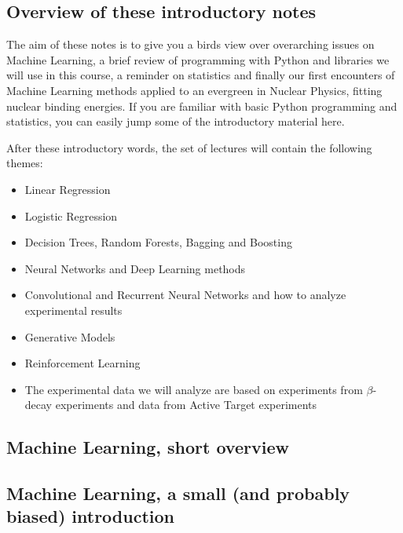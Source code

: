 \documentclass[%
oneside,                 %
final,                   %
10pt]{article}
\begin{document}
\subsection{Overview of these introductory notes}

The aim of these notes is to give you a birds view over overarching issues on  Machine Learning, a brief review of programming with Python and libraries we will use in this course, a reminder on statistics and finally our first encounters of Machine Learning methods applied to an evergreen in Nuclear Physics, fitting nuclear binding energies.
If you are familiar with basic Python programming and statistics, you can easily jump some of the introductory material here.

After these introductory words, the set of lectures will contain the following themes:
\begin{itemize}
\item Linear Regression

\item Logistic Regression

\item Decision Trees, Random Forests, Bagging and Boosting

\item Neural Networks and Deep Learning methods

\item Convolutional and Recurrent Neural Networks and how to analyze experimental results

\item Generative Models

\item Reinforcement Learning

\item The experimental data we will analyze are based on experiments from $\beta$-decay experiments and data from Active Target experiments
\end{itemize}

\noindent


\subsection{Machine Learning, short overview}


\subsection{Machine Learning, a small (and probably biased) introduction}
\end{document}
